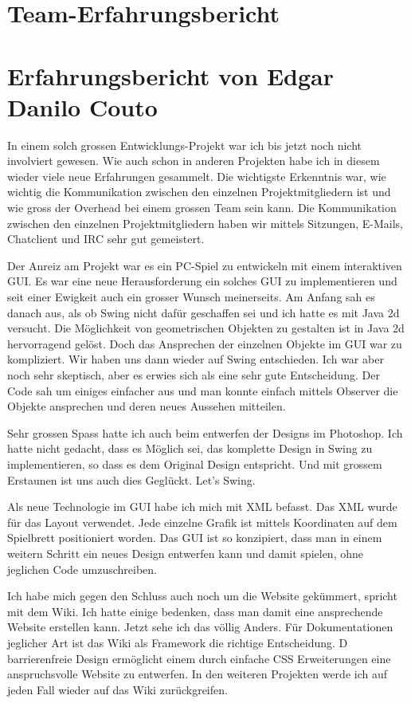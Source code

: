 \documentclass[12pt,halfparskip]{scrartcl}
\begin{document}


\section{Team-Erfahrungsbericht}


\section{Erfahrungsbericht von Edgar Danilo Couto}

In einem solch grossen Entwicklungs-Projekt war ich bis jetzt noch nicht involviert gewesen. Wie auch schon in anderen Projekten habe ich in diesem wieder viele neue Erfahrungen gesammelt. Die wichtigste Erkenntnis war, wie wichtig die Kommunikation zwischen den einzelnen Projektmitgliedern ist und wie gross der Overhead bei einem grossen Team sein kann. Die Kommunikation zwischen den einzelnen Projektmitgliedern haben wir mittels Sitzungen, E-Mails, Chatclient und IRC sehr gut gemeistert.

Der Anreiz am Projekt war es ein PC-Spiel zu entwickeln mit einem interaktiven GUI. Es war eine neue Herausforderung ein solches GUI zu implementieren und seit einer Ewigkeit auch ein grosser Wunsch meinerseits. Am Anfang sah es danach aus, als ob Swing nicht dafür geschaffen sei und ich hatte es mit Java 2d versucht. Die Möglichkeit von geometrischen Objekten zu gestalten ist in Java 2d hervorragend gelöst. Doch das Ansprechen der einzelnen Objekte im GUI war zu kompliziert. Wir haben uns dann wieder auf  Swing entschieden. Ich war aber noch sehr skeptisch, aber es erwies sich als eine sehr gute Entscheidung. Der Code sah um einiges einfacher aus und man konnte einfach mittels Observer die Objekte ansprechen und deren neues Aussehen mitteilen. 

Sehr grossen Spass hatte ich auch beim entwerfen der Designs im Photoshop. Ich hatte nicht gedacht, dass es Möglich sei, das komplette Design in Swing zu implementieren, so dass es dem Original Design entspricht. Und mit grossem Erstaunen ist uns auch dies Geglückt. Let’s Swing. 

Als neue Technologie im GUI habe ich mich mit XML befasst. Das XML wurde für das Layout verwendet. Jede einzelne Grafik ist mittels Koordinaten auf dem Spielbrett positioniert worden. Das GUI ist so konzipiert, dass man in einem weitern Schritt ein neues Design entwerfen kann und damit spielen, ohne jeglichen Code umzuschreiben.

Ich habe mich gegen den Schluss auch noch um die Website gekümmert, spricht mit dem Wiki. Ich hatte einige bedenken, dass man damit eine ansprechende Website erstellen kann. Jetzt sehe ich das völlig Anders. Für Dokumentationen jeglicher Art ist das Wiki als Framework die richtige Entscheidung. D barrierenfreie Design ermöglicht einem durch einfache CSS Erweiterungen eine anspruchsvolle Website zu entwerfen. In den weiteren Projekten werde ich auf jeden Fall wieder auf das Wiki zurückgreifen.
\end{document}
